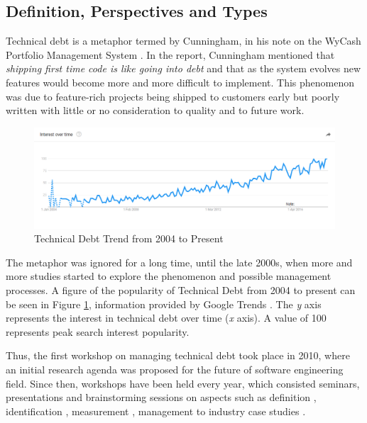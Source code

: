 \documentclass{mprop}
\begin{document}
\subsection{Definition, Perspectives and Types}
\label{section:def}

Technical debt is a metaphor termed by Cunningham, in his note on the WyCash
Portfolio Management System \cite{Cunningham1993}. In the report, Cunningham
mentioned that \textit{shipping first time code is like going into debt} and
that as the system evolves new features would become more and more difficult to
implement. This phenomenon was due to feature-rich projects being shipped to
customers early but poorly written with little or no consideration to quality
and to future work.

\begin{figure}
	\centering
	\includegraphics[width=\linewidth]{visualisations/TD_trend.png}
	\caption{Technical Debt Trend from 2004 to Present}
	\label{fig:td-trend}
\end{figure}

The metaphor was ignored for a long time, until the late 2000s, when more and
more studies started to explore the phenomenon and possible management
processes. A figure of the popularity of Technical Debt from 2004 to present can
be seen in Figure \ref{fig:td-trend}, information provided by Google Trends
\cite{GoogleTrends}. The \textit{y} axis represents the interest in technical
debt over time (\textit{x} axis). A value of 100 represents peak search interest
popularity.

Thus, the first workshop on managing technical debt took place in 2010, where an
initial research agenda was proposed for the future of software engineering
field. Since then, workshops have been held every year, which consisted
seminars, presentations and brainstorming sessions on aspects such as definition
\cite{Kruchten2012} \cite{Theodoropoulos2011} \cite{Schmid2013}, identification
\cite{Ernst2012}, measurement \cite{Letouzey2012} \cite{Curtis2012}
\cite{Nugroho2011} \cite{Zazworka2011} \cite{Fontana2012} \cite{Bohnet2011},
management \cite{Guo2011} \cite{Zazworka2011Prioritise} \cite{Seaman2012} to
industry case studies \cite{Lim2012} \cite{Morgenthaler2012} \cite{Codabux2013}
\cite{Holvitie2014} \cite{Klinger2011}.
\end{document}
